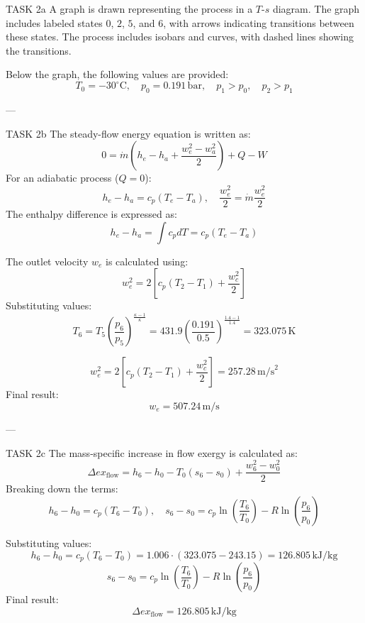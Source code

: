 TASK 2a  
A graph is drawn representing the process in a \( T \)-\( s \) diagram. The graph includes labeled states \( 0 \), \( 2 \), \( 5 \), and \( 6 \), with arrows indicating transitions between these states. The process includes isobars and curves, with dashed lines showing the transitions.  

Below the graph, the following values are provided:  
\[
T_0 = -30^\circ\text{C}, \quad p_0 = 0.191 \, \text{bar}, \quad p_1 > p_0, \quad p_2 > p_1
\]

---

TASK 2b  
The steady-flow energy equation is written as:  
\[
0 = \dot{m} \left( h_e - h_a + \frac{w_e^2 - w_a^2}{2} \right) + Q - W
\]  
For an adiabatic process (\( Q = 0 \)):  
\[
h_e - h_a = c_p (T_e - T_a), \quad \frac{w_e^2}{2} = \dot{m} \frac{w_e^2}{2}
\]  
The enthalpy difference is expressed as:  
\[
h_e - h_a = \int c_p dT = c_p (T_e - T_a)
\]  

The outlet velocity \( w_e \) is calculated using:  
\[
w_e^2 = 2 \left[ c_p (T_2 - T_1) + \frac{w_c^2}{2} \right]
\]  
Substituting values:  
\[
T_6 = T_5 \left( \frac{p_6}{p_5} \right)^{\frac{\kappa - 1}{\kappa}} = 431.9 \left( \frac{0.191}{0.5} \right)^{\frac{1.4 - 1}{1.4}} = 323.075 \, \text{K}
\]  

\[
w_e^2 = 2 \left[ c_p (T_2 - T_1) + \frac{w_c^2}{2} \right] = 257.28 \, \text{m/s}^2
\]  
Final result:  
\[
w_e = 507.24 \, \text{m/s}
\]

---

TASK 2c  
The mass-specific increase in flow exergy is calculated as:  
\[
\Delta ex_{\text{flow}} = h_6 - h_0 - T_0 (s_6 - s_0) + \frac{w_6^2 - w_0^2}{2}
\]  
Breaking down the terms:  
\[
h_6 - h_0 = c_p (T_6 - T_0), \quad s_6 - s_0 = c_p \ln \left( \frac{T_6}{T_0} \right) - R \ln \left( \frac{p_6}{p_0} \right)
\]  

Substituting values:  
\[
h_6 - h_0 = c_p (T_6 - T_0) = 1.006 \cdot (323.075 - 243.15) = 126.805 \, \text{kJ/kg}
\]  
\[
s_6 - s_0 = c_p \ln \left( \frac{T_6}{T_0} \right) - R \ln \left( \frac{p_6}{p_0} \right)
\]  
Final result:  
\[
\Delta ex_{\text{flow}} = 126.805 \, \text{kJ/kg}
\]